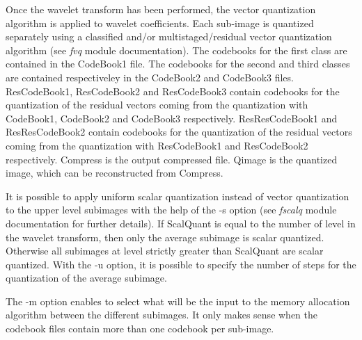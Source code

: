 Once the wavelet transform has been performed, the vector quantization 
algorithm is applied to wavelet coefficients. Each sub-image is 
quantized separately using a classified and/or multistaged/residual 
vector quantization algorithm (see {\em fvq} module documentation). 
The codebooks for the first class are contained in the CodeBook1 file.  
The codebooks for the second and third classes 
are contained respectiveley in the CodeBook2 and CodeBook3 files. 
ResCodeBook1, ResCodeBook2 and ResCodeBook3 contain codebooks 
for the quantization of the residual vectors coming from the 
quantization with CodeBook1, CodeBook2 and CodeBook3 respectively. 
ResResCodeBook1 and ResResCodeBook2 contain codebooks 
for the quantization of the residual vectors coming from the 
quantization with ResCodeBook1 and ResCodeBook2 respectively. 
Compress is the output compressed file. 
Qimage is the quantized image, which can be reconstructed from Compress. 

It is possible to apply uniform scalar quantization instead of vector 
quantization to the upper level subimages with the help of the -s option 
(see {\em fscalq} module documentation for further details). 
If ScalQuant is equal to the number of level in the wavelet transform, then 
only the average subimage is scalar quantized. Otherwise all subimages 
at level strictly greater than ScalQuant are scalar quantized. 
With the -u option, it is possible to specify the number of steps 
for the quantization of the average subimage. 

The -m option enables to select what will be the input to the memory 
allocation algorithm between the different subimages. It only makes sense 
when the codebook files contain more than one codebook per sub-image. 


